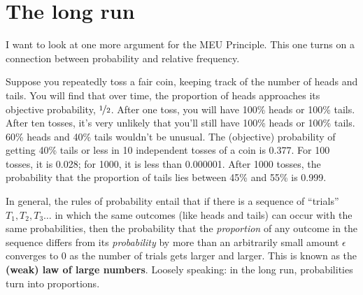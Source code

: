 


\section{The long run}

I want to look at one more argument for the MEU Principle. This one turns on a
connection between probability and relative frequency.

Suppose you repeatedly toss a fair coin, keeping track of the number of heads
and tails. You will find that over time, the proportion of heads approaches its
objective probability, $\nicefrac{1}{2}$. After one toss, you will have 100\%
heads or 100\% tails. After ten tosses, it's very unlikely that you'll still
have 100\% heads or 100\% tails. 60\% heads and 40\% tails wouldn't be unusual.
The (objective) probability of getting 40\% tails or less in 10 independent
tosses of a coin is 0.377. For 100 tosses, it is 0.028; for 1000, it is less
than 0.000001. After 1000 tosses, the probability that the proportion of tails
lies between 45\% and 55\% is 0.999.

In general, the rules of probability entail that if there is a sequence of
``trials'' $T_1,T_2,T_3\ldots$ in which the same outcomes (like heads and tails)
can occur with the same probabilities, then the probability that the
\emph{proportion} of any outcome in the sequence differs from its
\emph{probability} by more than an arbitrarily small amount $\epsilon$ converges
to 0 as the number of trials gets larger and larger. This is known as the
\textbf{(weak) law of large numbers}. Loosely speaking: in the long run,
probabilities turn into proportions.

